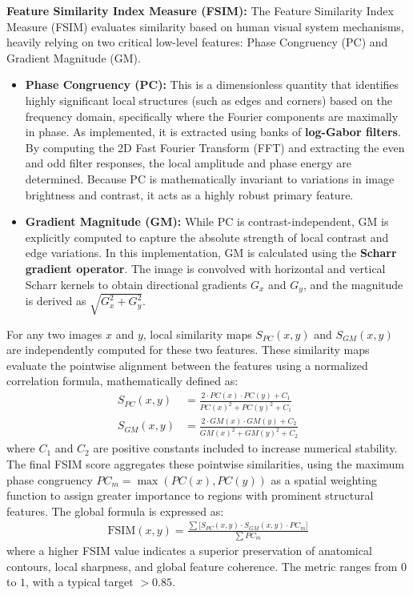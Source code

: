 \documentclass[11pt,a4paper]{article}
\begin{document}
\vspace{2mm}
\noindent
\textbf{Feature Similarity Index Measure (FSIM):} The Feature Similarity Index Measure (FSIM) \cite{zhang2011fsim} evaluates similarity based on human visual system mechanisms, heavily relying on two critical low-level features: Phase Congruency (PC) and Gradient Magnitude (GM). 
\begin{itemize}
    \item \textbf{Phase Congruency (PC):} This is a dimensionless quantity that identifies highly significant local structures (such as edges and corners) based on the frequency domain, specifically where the Fourier components are maximally in phase. As implemented, it is extracted using banks of \textbf{log-Gabor filters}. By computing the 2D Fast Fourier Transform (FFT) and extracting the even and odd filter responses, the local amplitude and phase energy are determined. Because PC is mathematically invariant to variations in image brightness and contrast, it acts as a highly robust primary feature.
    \item \textbf{Gradient Magnitude (GM):} While PC is contrast-independent, GM is explicitly computed to capture the absolute strength of local contrast and edge variations. In this implementation, GM is calculated using the \textbf{Scharr gradient operator}. The image is convolved with horizontal and vertical Scharr kernels to obtain directional gradients $G_x$ and $G_y$, and the magnitude is derived as $\sqrt{G_x^2 + G_y^2}$.
\end{itemize}
For any two images $x$ and $y$, local similarity maps $S_{PC}(x,y)$ and $S_{GM}(x,y)$ are independently computed for these two features. These similarity maps evaluate the pointwise alignment between the features using a normalized correlation formula, mathematically defined as:
\begin{align}
    S_{PC}(x, y) &= \frac{2 \cdot PC(x) \cdot PC(y) + C_1}{PC(x)^2 + PC(y)^2 + C_1} \\
    S_{GM}(x, y) &= \frac{2 \cdot GM(x) \cdot GM(y) + C_2}{GM(x)^2 + GM(y)^2 + C_2}
\end{align}
where $C_1$ and $C_2$ are positive constants included to increase numerical stability. 
The final FSIM score aggregates these pointwise similarities, using the maximum phase congruency $PC_m = \max(PC(x), PC(y))$ as a spatial weighting function to assign greater importance to regions with prominent structural features. The global formula is expressed as:
\begin{align}
    \text{FSIM}(x, y) = \frac{\sum \big[S_{PC}(x,y) \cdot S_{GM}(x,y) \cdot PC_m\big]}{\sum PC_m}
\end{align}
where a higher FSIM value indicates a superior preservation of anatomical contours, local sharpness, and global feature coherence. The metric ranges from $0$ to $1$, with a typical target $> 0.85$.
\end{document}
